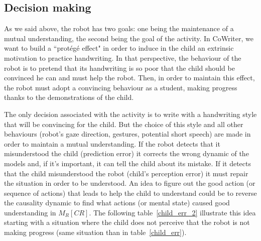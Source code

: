 \documentclass[10pt,a4paper]{article}
\begin{document}
\subsection{Decision making}
\label{ssec:decision}

As we said above, the robot has two goals: one being the maintenance of a mutual understanding, the second being the goal of the activity. 
In CoWriter, we want to build a ``prot\'eg\'e effect" in order to induce in the child an extrinsic motivation to practice handwriting. 
In that perspective, the behaviour of the robot is to pretend that its handwriting is so poor that the child should be convinced he can and must help the robot. Then, in order to maintain this effect, the robot must adopt a convincing behaviour as a student, making progress thanks to the demonstrations of the child. 

The only decision associated with the activity is to write with a handwriting style that will be convincing for the child. 
But the choice of this style and all other behaviours (robot's gaze direction, gestures, potential short speech) are made in order to maintain a mutual understanding. 
If the robot detects that it misunderstood the child (prediction error) it corrects the wrong dynamic of the models and, if it's important, it can tell the child about its mistake. 
If it detects that the child misunderstood the robot (child's perception error) it must repair the situation in order to be understood. 
An idea to figure out the good action (or sequence of actions) that leads to help the child to understand could be to reverse the causality dynamic to find what actions (or mental state) caused good understanding in $M_R\left[CR\right]$. The following table~\ref{child_err_2} illustrate this idea starting with a situation where the child does not perceive that the robot is not making progress (same situation than in table~\ref{child_err}).
\end{document}
